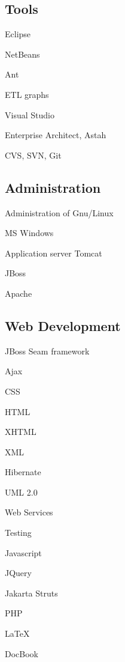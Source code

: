 \documentclass[czech]{article}
\renewenvironment{itemize}{
  \begin{list}{}{
    \setlength{\leftmargin}{1.5em}
  }
}{
  \end{list}
}
\begin{document}
\begin{multicols}{2}
\textcolor{coffee}{\subsection*{Tools}}
\begin{itemize}
\item Eclipse
\item NetBeans
\item Ant
\item ETL graphs
\item Visual Studio
\item Enterprise Architect, Astah
\item CVS, SVN, Git
\end{itemize}


\textcolor{coffee}{\subsection*{Administration}}
\begin{itemize}
  \item Administration of Gnu/Linux
  
  \item MS Windows
  
  \item Application server Tomcat
  \item JBoss
  \item Apache
  \item 
\end{itemize}
\end{multicols}
 
\textcolor{coffee}{\subsection*{Web Development}}
\begin{multicols}{3}
\begin{itemize}
\item JBoss Seam framework 
\item Ajax
\item CSS
\item HTML
\item XHTML
\item XML
\item Hibernate
\item UML 2.0
\item Web Services
\item Testing
\item Javascript
\item JQuery
\item Jakarta Struts
\item PHP
\item \LaTeX
\item DocBook
\end{itemize}
\end{multicols}
\end{document}
